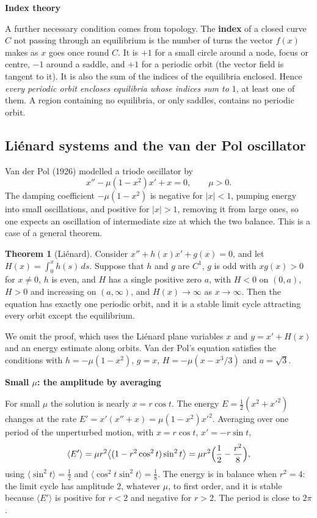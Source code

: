 \documentclass[11pt,a4paper]{article}
\numberwithin{equation}{section}
\theoremstyle{definition}
\newtheorem{thm}{Theorem}[subsection]
\newcommand{\subhead}[1]{%
  \par\medskip\noindent\textbf{#1}\par\nobreak\smallskip}
\begin{document}
\subhead{Index theory}
A further necessary condition comes from topology. The \textbf{index} of a closed curve $C$ not passing through an equilibrium is the number of turns the vector $f(x)$ makes as $x$ goes once round $C$.
It is $+1$ for a small circle around a node, focus or centre, $-1$ around a saddle, and $+1$ for a periodic orbit (the vector field is tangent to it). It is also the sum of the indices of
the equilibria enclosed. Hence \emph{every periodic orbit encloses equilibria whose indices sum to $1$}, at least one of them. A region containing no equilibria, or only saddles, contains no periodic orbit.

\subsection{Li\'enard systems and the van der Pol oscillator}
\label{ssec:lienard}

Van der Pol (1926) modelled a triode oscillator by
\[
x'' - \mu(1 - x^2)x' + x = 0, \qquad \mu > 0 .
\]
The damping coefficient $-\mu(1 - x^2)$ is negative for $|x| < 1$, pumping energy into small oscillations, and positive for $|x| > 1$, removing it from large ones, so one expects an oscillation of
intermediate size at which the two balance. This is a case of a general theorem.

\begin{thm}[Li\'enard]
\label{thm:lienard}
Consider $x'' + h(x)x' + g(x) = 0$, and let $H(x) = \int_0^xh(s)\,ds$. Suppose that $h$ and $g$ are $C^1$, $g$ is odd with $xg(x) > 0$ for $x \neq 0$, $h$ is even, and $H$ has a single positive zero $a$, with
$H < 0$ on $(0, a)$, $H > 0$ and increasing on $(a, \infty)$, and $H(x) \to \infty$ as $x \to \infty$. Then the equation has exactly one periodic orbit, and it is a stable limit cycle attracting every orbit except
the equilibrium.
\end{thm}

We omit the proof, which uses the Li\'enard plane variables $x$ and $y = x' + H(x)$ and an energy estimate along orbits. Van der Pol's equation satisfies the conditions with $h = -\mu(1 - x^2)$, $g = x$,
$H = -\mu(x - x^3/3)$ and $a = \sqrt3$.

\subhead{Small $\mu$: the amplitude by averaging}
For small $\mu$ the solution is nearly $x = r\cos t$. The energy $E = \frac12(x^2 + x'^2)$ changes at the rate $E' = x'(x'' + x) = \mu(1 - x^2)x'^2$. Averaging over one period of the unperturbed motion, with $x = r\cos t$,
$x' = -r\sin t$,
\[
\langle E'\rangle = \mu r^2\bigl\langle(1 - r^2\cos^2t)\sin^2t\bigr\rangle = \mu r^2\Bigl(\frac12 - \frac{r^2}{8}\Bigr) ,
\]
using $\langle\sin^2t\rangle = \frac12$ and $\langle\cos^2t\sin^2t\rangle = \frac18$. The energy is in balance when $r^2 = 4$: the limit cycle has amplitude $2$, whatever $\mu$, to first order, and it is stable because
$\langle E'\rangle$ is positive for $r < 2$ and negative for $r > 2$. The period is close to $2\pi$.
\end{document}
